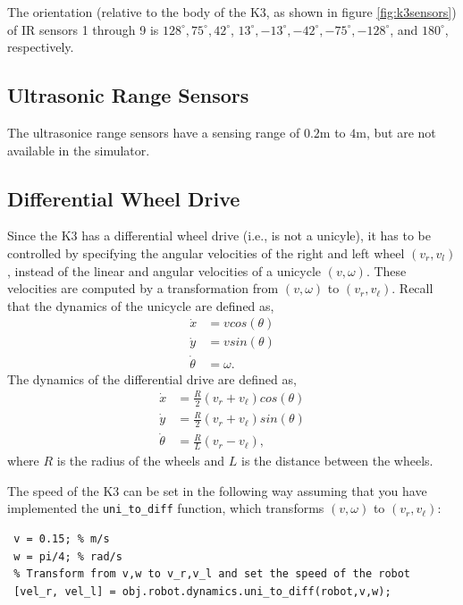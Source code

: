 \documentclass[10pt]{article}
\begin{document}
The orientation (relative to the body of the K3, as shown in figure \ref{fig:k3sensors}) of IR sensors 1 through 9 is $128^\circ, 75^\circ, 42^\circ$, $13^\circ, -13^\circ, -42^\circ, -75^\circ, -128^\circ$, and $180^\circ$, respectively.

\subsection{Ultrasonic Range Sensors}
The ultrasonice range sensors have a sensing range of $0.2$m to $4$m, but are not available in the simulator.

\subsection{Differential Wheel Drive}\label{diffdrive}
Since the K3 has a differential wheel drive (i.e., is not a unicyle), it has to be controlled by specifying the angular velocities of the right and left wheel $(v_r,v_l)$, instead of the linear and angular velocities of a unicycle $(v,\omega)$. These velocities are computed by a transformation from $(v,\omega)$ to $(v_r,v_\ell)$. Recall that the dynamics of the unicycle are defined as,
\begin{equation}
 \begin{split}
   \dot{x} &= vcos(\theta) \\
   \dot{y} &= vsin(\theta) \\
   \dot{\theta} &= \omega.
 \end{split}
\end{equation}
The dynamics of the differential drive are defined as,
\begin{equation}
 \begin{split}
  \dot{x} &= \frac{R}{2}(v_r+v_\ell)cos(\theta) \\
  \dot{y} &= \frac{R}{2}(v_r+v_\ell)sin(\theta) \\
  \dot{\theta} &= \frac{R}{L}(v_r-v_\ell),
 \end{split}
\end{equation}
where $R$ is the radius of the wheels and $L$ is the distance between the wheels.

The speed of the K3 can be set in the following way assuming that you have implemented the \texttt{uni\_to\_diff} function, which transforms $(v,\omega)$ to $(v_r,v_\ell)$:
\begin{verbatim}
 v = 0.15; % m/s
 w = pi/4; % rad/s
 % Transform from v,w to v_r,v_l and set the speed of the robot
 [vel_r, vel_l] = obj.robot.dynamics.uni_to_diff(robot,v,w);
\end{verbatim}
\end{document}
